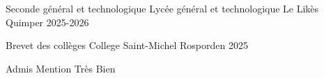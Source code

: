 

\begin{cventries}

  \cventry
    {Seconde général et technologique} %
    {Lycée général et technologique Le Likès} %
    {Quimper} %
    {2025-2026} %
    {
    }

\cventry
    {Brevet des collèges} %
    {College Saint-Michel} %
    {Rosporden} %
    {2025} %
    {
      \begin{cvitems} %
        \item {Admis Mention Très Bien}
      \end{cvitems}
    }
\end{cventries}

